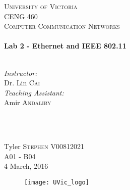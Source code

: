 \begin{titlepage}

\center
 
\textsc{\LARGE University of Victoria}\\[1cm] 	%
\textsc{\Large CENG 460}\\[0.5cm] 			%
\textsc{\large Computer Communication Networks}\\[0.5cm] 		%


\HRule \\[0.4cm]
{\huge \bfseries Lab 2 - Ethernet and IEEE 802.11}\\[0.2cm] %
\HRule \\[1.5cm]
 
 
\begin{minipage}{0.7\textwidth}
\begin{flushleft} 

\large\emph{Instructor:} \\
Dr. Lin \textsc{Cai} \\
\vspace{12 pt}
\emph{Teaching Assistant:} \\
Amir \textsc{Andaliby}

\end{flushleft}
\end{minipage}
~
\begin{minipage}{0.1\textwidth}
\begin{flushright} \large

\vspace{12 pt}

\end{flushright}
\end{minipage}\\[2cm]


\Large Tyler \textsc{Stephen}
\large V00812021	\\
A01 - B04\\[1.5cm] 


{\large 4 March, 2016}\\ %

\begin{figure}[b]	 %
	\centering
	\texttt{[image: UVic\_logo]}
\end{figure}

\end{titlepage}
